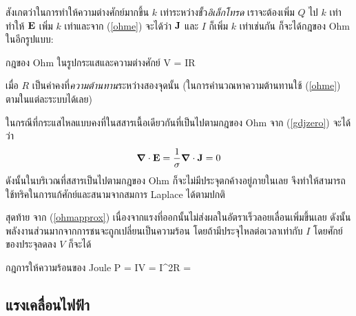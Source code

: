 สังเกตว่าในการทำให้ความต่างศักย์มากขึ้น $k$ เท่าระหว่างขั้ว\emph{อิเล็กโทรด} เราจะต้องเพิ่ม $Q$ ไป $k$ เท่า ทำให้ $\mathbf{E}$ เพิ่ม $k$ เท่าและจาก (\ref{ohme}) จะได้ว่า $\mathbf{J}$ และ $I$ ก็เพิ่ม $k$ เท่าเช่นกัน ก็จะได้กฎของ Ohm ในอีกรูปแบบ:
\begin{ieqbox}{กฎของ Ohm ในรูปกระแสและความต่างศักย์} 
    V = IR \label{ohmv}
\end{ieqbox}
เมื่อ $R$ เป็นค่าคงที่\emph{ความต้านทาน}ระหว่างสองจุดนั้น (ในการคำนวณหาความต้านทานใช้ (\ref{ohme}) ตามในแต่ละระบบได้เลย)

ในกรณีที่กระแสไหลแบบคงที่ในสสารเนื้อเดียวกันที่เป็นไปตามกฎของ Ohm จาก (\ref{gdjzero}) จะได้ว่า
\begin{equation} 
    \boldsymbol{\nabla}\cdot\mathbf{E} = \frac{1}{\sigma}\boldsymbol{\nabla}\cdot\mathbf{J} = 0 
\end{equation}
ดังนั้นในบริเวณที่สสารเป็นไปตามกฎของ Ohm ก็จะไม่มีประจุตกค้างอยู่ภายในเลย จึงทำให้สามารถใช้ทริคในการแก้ศักย์และสนามจากสมการ Laplace ได้ตามปกติ

สุดท้าย จาก (\ref{ohmapprox}) เนื่องจากแรงที่ออกนั้นไม่ส่งผลในอัตราเร็วลอยเลื่อนเพิ่มขึ้นเลย ดังนั้นพลังงานส่วนมากจากการชนจะถูกเปลี่ยนเป็นความร้อน โดยถ้ามีประจุไหลต่อเวลาเท่ากับ $I$ โดยศักย์ของประจุลดลง $V$ ก็จะได้
\begin{ieqbox}{กฎการให้ความร้อนของ Joule} 
    P = IV = I^2R =  
\end{ieqbox}

\subsection{แรงเคลื่อนไฟฟ้า}

